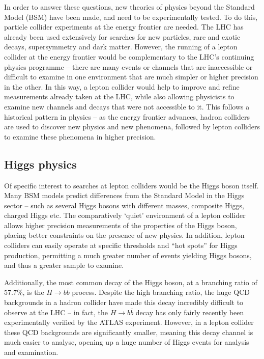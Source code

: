 In order to answer these questions, new theories of physics beyond the Standard Model (\acrshort{BSM}) have been made, and need to be experimentally tested. To do this, particle collider experiments at the energy frontier are needed. The \acrfull{LHC} has already been used extensively for searches for new particles, rare and exotic decays, supersymmetry and dark matter. However, the running of a lepton collider at the energy frontier would be complementary to the \acrlong{LHC}'s continuing physics programme -- there are many events or channels that are inaccessible or difficult to examine in one environment that are much simpler or higher precision in the other. In this way, a lepton collider would help to improve and refine measurements already taken at the \acrshort{LHC}, while also allowing physicists to examine new channels and decays that were not accessible to it. This follows a historical pattern in physics -- as the energy frontier advances, hadron colliders are used to discover new physics and new phenomena, followed by lepton colliders to examine these phenomena in higher precision.

\subsection{Higgs physics}
Of specific interest to searches at lepton colliders would be the Higgs boson itself. Many \acrshort{BSM} models predict differences from the Standard Model in the Higgs sector -- such as several Higgs bosons with different masses, composite Higgs, charged Higgs etc. The comparatively `quiet' environment of a lepton collider allows higher precision measurements of the properties of the Higgs boson, placing better constraints on the presence of new physics. In addition, lepton colliders can easily operate at specific thresholds and ``hot spots'' for Higgs production, permitting a much greater number of events yielding Higgs bosons, and thus a greater sample to examine.

Additionally, the most common decay of the Higgs boson, at a branching ratio of 57.7\%, is the $H \rightarrow b \overline{b}$ process. Despite the high branching ratio, the huge \acrshort{QCD} backgrounds in a hadron collider have made this decay incredibly difficult to observe at the LHC -- in fact, the $H \rightarrow b \overline{b}$ decay has only fairly recently been experimentally verified by the \acrshort{ATLAS} experiment. However, in a lepton collider these \acrshort{QCD} backgrounds are significantly smaller, meaning this decay channel is much easier to analyse, opening up a huge number of Higgs events for analysis and examination.

